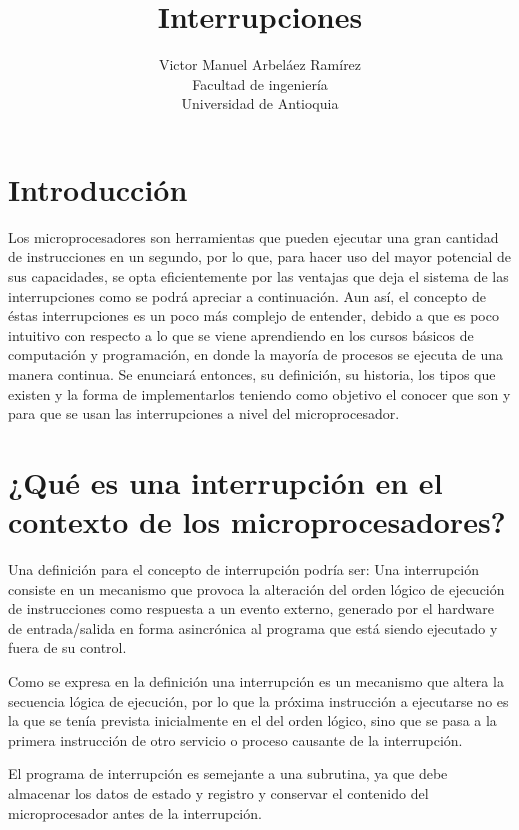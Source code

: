 \documentclass[12pt, letter]{article}
\title{\huge{Interrupciones}}
\author{Victor Manuel Arbeláez Ramírez \\ Facultad de ingeniería \\ Universidad de Antioquia}
\date{}
\begin{document}
\raggedright

\maketitle


\section*{Introducción}
Los microprocesadores son herramientas que pueden ejecutar una gran cantidad de instrucciones en un segundo, por lo que, para hacer uso del mayor potencial de sus capacidades, se opta eficientemente por las ventajas que deja el sistema de las interrupciones como se podrá apreciar a continuación. Aun así, el concepto de éstas interrupciones es un poco más complejo de entender, debido a que es poco intuitivo con respecto a lo que se viene aprendiendo en los cursos básicos de computación y programación, en donde la mayoría de procesos se ejecuta de una manera continua. Se enunciará entonces, su definición, su historia, los tipos que existen y la forma de implementarlos teniendo como objetivo el conocer que son y para que se usan las interrupciones a nivel del microprocesador.
\newpage

\section*{¿Qué es una interrupción en el contexto de los microprocesadores?}

\setlength{\parindent}{31pt}
Una definición para el concepto de interrupción podría ser: Una interrupción consiste en un mecanismo que provoca la alteración del orden lógico de ejecución de instrucciones como respuesta a un evento externo, generado por el hardware de entrada/salida en forma asincrónica al programa que está siendo ejecutado y fuera de su control. 

\setlength{\parindent}{31pt}
Como se expresa en la definición una interrupción es un mecanismo que altera la secuencia lógica de ejecución, por lo que la próxima instrucción a ejecutarse no es la que se tenía prevista inicialmente en el del orden lógico, sino que se pasa a la primera instrucción de otro servicio o proceso causante de la interrupción.

\setlength{\parindent}{31pt}
El programa de interrupción es semejante a una subrutina, ya que debe almacenar los datos de estado y registro y conservar el contenido del microprocesador antes de la interrupción.
\end{document}
